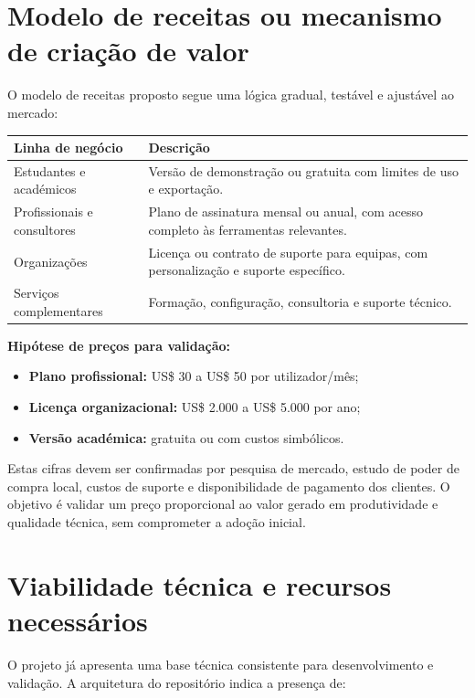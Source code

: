 \documentclass[11pt,a4paper]{article}
\begin{document}
\section{Modelo de receitas ou mecanismo de criação de valor}
O modelo de receitas proposto segue uma lógica gradual, testável e ajustável ao mercado:

\begin{table}[H]
\centering
\small
\begin{tabularx}{\textwidth}{>{\raggedright\arraybackslash}X|X}
\toprule
\textbf{Linha de negócio} & \textbf{Descrição} \\
\midrule
Estudantes e académicos & Versão de demonstração ou gratuita com limites de uso e exportação. \\
Profissionais e consultores & Plano de assinatura mensal ou anual, com acesso completo às ferramentas relevantes. \\
Organizações & Licença ou contrato de suporte para equipas, com personalização e suporte específico. \\
Serviços complementares & Formação, configuração, consultoria e suporte técnico. \\
\bottomrule
\end{tabularx}
\end{table}

\textbf{Hipótese de preços para validação:}
\begin{itemize}
    \item \textbf{Plano profissional:} US\$ 30 a US\$ 50 por utilizador/mês;
    \item \textbf{Licença organizacional:} US\$ 2.000 a US\$ 5.000 por ano;
    \item \textbf{Versão académica:} gratuita ou com custos simbólicos.
\end{itemize}

Estas cifras devem ser confirmadas por pesquisa de mercado, estudo de poder de compra local, custos de suporte e disponibilidade de pagamento dos clientes. O objetivo é validar um preço proporcional ao valor gerado em produtividade e qualidade técnica, sem comprometer a adoção inicial.

\section{Viabilidade técnica e recursos necessários}
O projeto já apresenta uma base técnica consistente para desenvolvimento e validação. A arquitetura do repositório indica a presença de:
\end{document}
